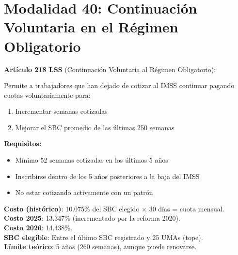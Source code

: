 \documentclass[11pt,a4paper]{report}
\begin{document}
\section{Modalidad 40: Continuaci\'on Voluntaria en el R\'egimen Obligatorio}

\begin{tcolorbox}[colback=blue!5!white, colframe=blue!75!black, title=\textbf{Definici\'on Formal}]
\textbf{Art\'iculo 218 LSS} (Continuaci\'on Voluntaria al R\'egimen Obligatorio):

Permite a trabajadores que han dejado de cotizar al IMSS continuar pagando cuotas voluntariamente para:
\begin{enumerate}[nosep]
\item Incrementar semanas cotizadas
\item Mejorar el SBC promedio de las \'ultimas 250 semanas
\end{enumerate}

\textbf{Requisitos:}
\begin{itemize}[nosep]
\item M\'inimo 52 semanas cotizadas en los \'ultimos 5 a\~nos
\item Inscribirse dentro de los 5 a\~nos posteriores a la baja del IMSS
\item No estar cotizando activamente con un patr\'on
\end{itemize}

\textbf{Costo (hist\'orico)}: 10.075\% del SBC elegido $\times$ 30 d\'ias = cuota mensual.\\
\textbf{Costo 2025}: 13.347\% (incrementado por la reforma 2020).\\
\textbf{Costo 2026}: 14.438\%.\\
\textbf{SBC elegible}: Entre el \'ultimo SBC registrado y 25 UMAs (tope).\\
\textbf{L\'imite te\'orico}: 5 a\~nos (260 semanas), aunque puede renovarse.
\end{tcolorbox}
\end{document}
